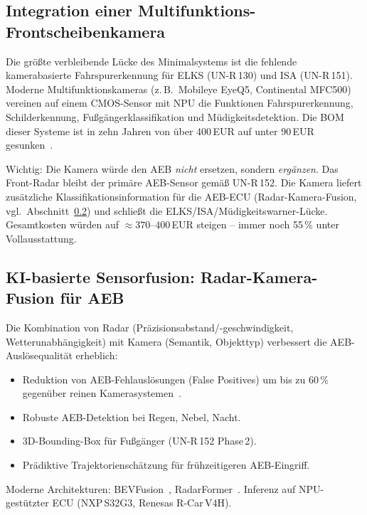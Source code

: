 \documentclass[a4paper,12pt]{article}
\theoremstyle{definition}
\begin{document}
\subsection{Integration einer Multifunktions-Frontscheibenkamera}

Die gr\"o\ss{}te verbleibende L\"ucke des Minimalsystems ist die fehlende
kamerabasierte Fahrspurerkennung f\"ur ELKS (UN-R\,130) und ISA
(UN-R\,151). Moderne Multifunktionskameras (z.\,B.\ Mobileye EyeQ5,
Continental MFC500) vereinen auf einem CMOS-Sensor mit NPU die Funktionen
Fahrspurerkennung, Schilderkennung, Fu\ss{}g\"angerklassifikation und
M\"udigkeitsdetektion. Die BOM dieser Systeme ist in zehn Jahren von
\"uber 400\,EUR auf unter 90\,EUR gesunken~\cite{mobileye2023eyeq5}.

Wichtig: Die Kamera w\"urde den AEB \emph{nicht} ersetzen, sondern
\emph{erg\"anzen}. Das Front-Radar bleibt der prim\"are AEB-Sensor
gem\"a\ss{} UN-R\,152. Die Kamera liefert zus\"atzliche
Klassifikationsinformation f\"ur die AEB-ECU (Radar-Kamera-Fusion,
vgl.\ Abschnitt~\ref{subsec:ki_fusion}) und schlie\ss{}t die
ELKS/ISA/M\"udigkeitswarner-L\"ucke. Gesamtkosten w\"urden auf
$\approx370$--$400$\,EUR steigen -- immer noch 55\,\% unter Vollausstattung.

\subsection{KI-basierte Sensorfusion: Radar-Kamera-Fusion f\"ur AEB}
\label{subsec:ki_fusion}

Die Kombination von Radar (Pr\"azisionsabstand/-geschwindigkeit,
Wetterunabh\"angigkeit) mit Kamera (Semantik, Objekttyp) verbessert
die AEB-Ausl\"osequalit\"at erheblich:

\begin{itemize}
  \item Reduktion von AEB-Fehlausl\"osungen (False Positives) um bis zu
        60\,\% gegen\"uber reinen Kamerasystemen~\cite{euroancap2023aeb}.
  \item Robuste AEB-Detektion bei Regen, Nebel, Nacht.
  \item 3D-Bounding-Box f\"ur Fu\ss{}g\"anger (UN-R\,152 Phase\,2).
  \item Pr\"adiktive Trajektoriensch\"atzung f\"ur fr\"uhzeitigeren
        AEB-Eingriff.
\end{itemize}

Moderne Architekturen: BEVFusion~\cite{liu2023bevfusion},
RadarFormer~\cite{zhou2024radarformer}. Inferenz auf NPU-gest\"utzter
ECU (NXP\,S32G3, Renesas R-Car\,V4H).
\end{document}
